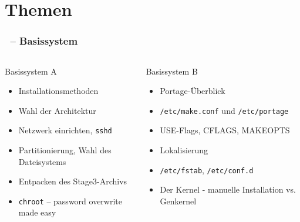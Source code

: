 \documentclass[utf8]{beamer}
\begin{document}
\section{Themen}

\begin{frame}
  \frametitle{\insertsectionhead\ -- Basissystem}
  
\begin{columns}
\begin{block}{Basissystem A}
  \begin{itemize}
    \item Installationsmethoden
    \item Wahl der Architektur
    \item Netzwerk einrichten, \texttt{sshd}
    \item Partitionierung, Wahl des Dateisystems 
    \item Entpacken des Stage3-Archivs
    \item \texttt{chroot} -- password overwrite made easy
  \end{itemize}
\end{block}

\begin{block}{Basissystem B}
  \begin{itemize}
    \item Portage-Überblick
    \item \texttt{/etc/make.conf} und \texttt{/etc/portage}
    \item USE-Flags, CFLAGS, MAKEOPTS
    \item Lokalisierung
    \item \texttt{/etc/fstab}, \texttt{/etc/conf.d}
    \item Der Kernel - manuelle Installation vs. Genkernel
  \end{itemize}
\end{block}
\end{columns}
\end{frame}
\end{document}

